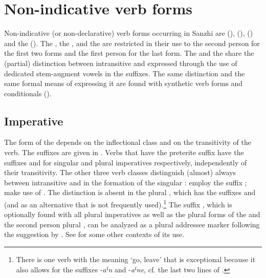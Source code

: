 \chapter{Non-indicative verb forms}
\label{cpt:verbs-nondeclarative}

Non-indicative (or non-declarative) verb forms occurring in Sanzhi are  (),  (),  () and the  (). The , the , and the  are restricted in their use to the second person for the first two forms and the first person for the last form. The  and the  share the (partial) distinction between intransitive and  expressed through the use of dedicated stem-augment vowels in the suffixes. The same distinction and the same formal means of expressing it are found with synthetic verb forms and conditionals ().



\section{Imperative}
\label{sec:imperative}

The form of the  depends on the inflectional class and on the transitivity of the verb. The suffixes are given in . Verbs that have the preterite suffix  have the suffixes  and  for singular and plural imperatives respectively, independently of their transitivity. The other three verb classes distinguish (almost) always between intransitive and  in the formation of the singular :  employ the suffix ;  make use of . The distinction is absent in the plural , which has the suffixes and  (and  as an alternative that is not frequently used).\footnote{There is one verb with the meaning `go, leave' that is exceptional because it also allows for the suffixes -\textit{aˁn} and -\textit{aˁne}, cf. the last two lines of .} The suffix , which is optionally found with all plural imperatives as well as the plural forms of the  and the second person plural , can be analyzed as a plural addressee marker following the suggestion by \citet[163]{Sumbatova.Lander2014}. See  for some other contexts of its use.

